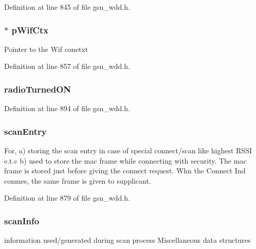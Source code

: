 Definition at line 845 of file gsn\_\-wdd.h.

\hypertarget{a00108_aa8e90d3c80ca98d22454e0840b8cf2d2}{
\subsubsection[{pWifCtx}]{$\ast$ {\bf pWifCtx}}}
\label{a00108_aa8e90d3c80ca98d22454e0840b8cf2d2}
Pointer to the Wif conetxt 

Definition at line 857 of file gsn\_\-wdd.h.

\hypertarget{a00108_a7d0790675b676ebbb64b9e32c44d967b}{
\subsubsection[{radioTurnedON}]{ {\bf radioTurnedON}}}
\label{a00108_a7d0790675b676ebbb64b9e32c44d967b}


Definition at line 894 of file gsn\_\-wdd.h.

\hypertarget{a00108_a277d09bbbced06de868965eda9b7d06b}{
\subsubsection[{scanEntry}]{ {\bf scanEntry}}}
\label{a00108_a277d09bbbced06de868965eda9b7d06b}
For, a) storing the scan entry in case of special connect/scan like highest RSSI e.t.c b) used to store the mac frame while connecting with security. The mac frame is stored just before giving the connect request. Whn the Connect Ind conmes, the same frame is given to supplicant. 

Definition at line 879 of file gsn\_\-wdd.h.

\hypertarget{a00108_a32138fdd69edb3149046cfcc175dba89}{
\subsubsection[{scanInfo}]{ {\bf scanInfo}}}
\label{a00108_a32138fdd69edb3149046cfcc175dba89}
information used/generated during scan process Miscellaneous data structures 

